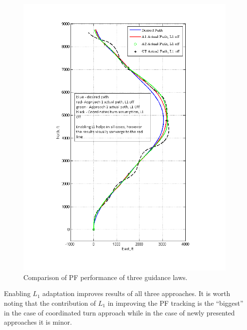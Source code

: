 \documentclass[]{article}
\begin{document}
\begin{figure}[thpb]
      \centering
      \includegraphics[width=110mm]{NEposition_3Apps.png}
      \caption{Comparison of PF performance of three guidance laws.}
      \label{fig:GLAW}
   \end{figure}

Enabling $L_1$ adaptation improves results of all three approaches. It is worth noting that the contribution of $L_1$  in improving the PF tracking is the ``biggest'' in the case of coordinated turn approach while in the case of newly presented approaches it is minor. 
\end{document}
